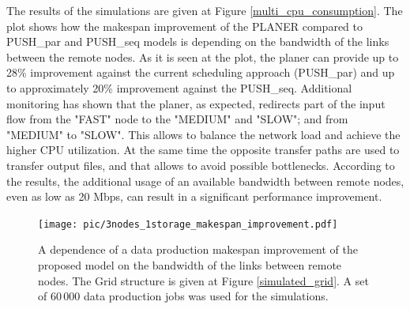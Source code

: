 \documentclass{svjour3}                     %
\begin{document}
The results of the simulations are given at Figure \ref{multi_cpu_consumption}. The plot shows how the makespan improvement of the PLANER compared to PUSH\_par and PUSH\_seq models is depending on the bandwidth of the links between the remote nodes. As it is seen at the plot, the planer can provide up to 28\% improvement against the current scheduling approach (PUSH\_par) and up to approximately 20\% improvement against the PUSH\_seq. Additional monitoring has shown that the planer, as expected, redirects part of the input flow from the "FAST" node to the "MEDIUM" and "SLOW"; and from "MEDIUM" to "SLOW". This allows to balance the network load and achieve the higher CPU utilization. At the same time the opposite transfer paths are used to transfer output files, and that allows to avoid possible bottlenecks. According to the results, the additional usage of an available bandwidth between remote nodes, even as low as 20 Mbps, can result in a significant performance improvement.
\begin{figure}
  \begin{center}
    \texttt{[image: pic/3nodes\_1storage\_makespan\_improvement.pdf]}
    \caption{A dependence of a data production makespan improvement of the proposed model on the bandwidth of the links between remote nodes. The Grid structure is given at Figure \ref{simulated_grid}.  A set of 60\,000 data production jobs was used for the simulations.}
      \label{multi_makespan_compare}	
  \end{center}  
\end{figure}
\end{document}
